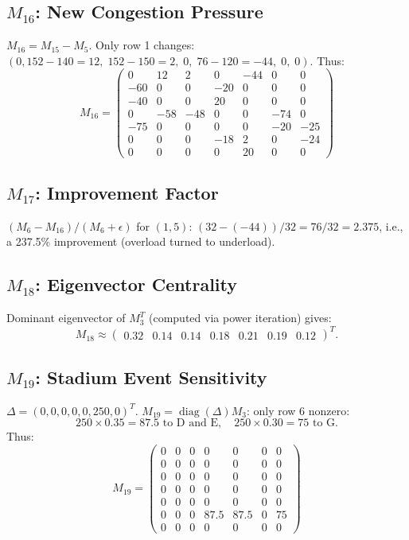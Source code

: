\documentclass{ximera}
\begin{document}
\subsection*{\texorpdfstring{\(M_{16}\)}{M16}: New Congestion Pressure}
\(M_{16} = M_{15} - M_5\). Only row 1 changes: \((0,152-140=12,\;152-150=2,\;0,\;76-120=-44,\;0,\;0)\).  
Thus:
\[
M_{16} = \begin{pmatrix}
0 & 12 & 2 & 0 & -44 & 0 & 0\\
-60 & 0 & 0 & -20 & 0 & 0 & 0\\
-40 & 0 & 0 & 20 & 0 & 0 & 0\\
0 & -58 & -48 & 0 & 0 & -74 & 0\\
-75 & 0 & 0 & 0 & 0 & -20 & -25\\
0 & 0 & 0 & -18 & 2 & 0 & -24\\
0 & 0 & 0 & 0 & 20 & 0 & 0
\end{pmatrix}
\]

\subsection*{\texorpdfstring{\(M_{17}\)}{M17}: Improvement Factor}
\((M_6 - M_{16}) / (M_6 + \epsilon)\) for \((1,5)\): \((32 - (-44)) / 32 = 76/32 = 2.375\), i.e., a 237.5\% improvement (overload turned to underload).

\subsection*{\texorpdfstring{\(M_{18}\)}{M18}: Eigenvector Centrality}
Dominant eigenvector of \(M_3^T\) (computed via power iteration) gives:
\[
M_{18} \approx \begin{pmatrix} 0.32 & 0.14 & 0.14 & 0.18 & 0.21 & 0.19 & 0.12 \end{pmatrix}^T.
\]

\subsection*{\texorpdfstring{\(M_{19}\)}{M19}: Stadium Event Sensitivity}
\(\Delta = (0,0,0,0,0,250,0)^T\). \(M_{19} = \operatorname{diag}(\Delta) M_3\): only row 6 nonzero:
\[
250\times0.35 = 87.5 \text{ to D and E}, \quad 250\times0.30 = 75 \text{ to G}.
\]
Thus:
\[
M_{19} = \begin{pmatrix}
0&0&0&0&0&0&0\\
0&0&0&0&0&0&0\\
0&0&0&0&0&0&0\\
0&0&0&0&0&0&0\\
0&0&0&0&0&0&0\\
0&0&0&87.5&87.5&0&75\\
0&0&0&0&0&0&0
\end{pmatrix}
\]
\end{document}
